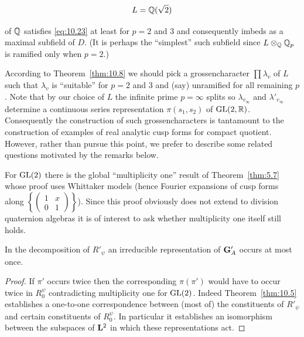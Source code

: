 \begin{remark}
\[
L = \mathbb{Q}(\sqrt{2})
\]

of $\mathbb{Q}$ satisfies \eqref{eq:10.23} at least for $p = 2$ and 3 and consequently imbeds as a maximal subfield of $D$. (It is perhaps the ``simplest'' such subfield since $L \otimes_{\mathbb{Q}} \mathbb{Q}_p$ is ramified only when $p = 2$.)

According to Theorem~\ref{thm:10.8} we should pick a grossencharacter $\prod \lambda_v$ of $L$ such that $\lambda_v$ is ``suitable'' for $p = 2$ and 3 and (say) unramified for all remaining $p$. Note that by our choice of $L$ the infinite prime $p = \infty$ splits so $\lambda_{v_\infty}$ and $\lambda'_{v_\infty}$ determine a continuous series representation $\pi(s_1, s_2)$ of $\operatorname{GL}(2, \mathbb{R})$. Consequently the construction of such grossencharacters is tantamount to the construction of examples of real analytic cusp forms for compact quotient. However, rather than pursue this point, we prefer to describe some related questions motivated by the remarks below.

\end{remark}

\begin{remark*}

For $\operatorname{GL}(2)$ there is the global ``multiplicity one'' result of Theorem~\ref{thm:5.7} whose proof uses Whittaker models (hence Fourier expansions of cusp forms along $\left\{\begin{pmatrix} 1 & x \\ 0 & 1 \end{pmatrix}\right\}$). Since this proof obviously does not extend to division quaternion algebras it is of interest to ask whether multiplicity one itself still holds.

\end{remark*}

\begin{theorem}\label{thm:10.10}

In the decomposition of $R'_\psi$ an irreducible representation of $\mathbf{G}'_A$ occurs at most once.

\end{theorem}

\begin{proof}

If $\pi'$ occurs twice then the corresponding $\pi(\pi')$ would have to occur twice in $R^{\psi}_0$ contradicting multiplicity one for $\operatorname{GL}(2)$. Indeed Theorem~\ref{thm:10.5} establishes a one-to-one correspondence between (most of) the constituents of $R'_\psi$ and certain constituents of $R^{\psi}_0$. In particular it establishes an isomorphism between the subspaces of $\mathbf{L}^2$ in which these representations act.

\end{proof}

